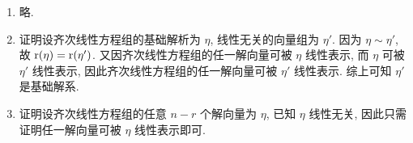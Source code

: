 % 
\begin{enumerate}
    \item %
        略.
    \item %
        {\heiti 证明}\quad 设齐次线性方程组的基础解析为 $\eta$, 线性无关的向量组为 $\eta'$.
        因为 $\eta \sim \eta'$, 故 $\mathrm{r}(\eta) = \mathrm{r}(\eta')$. 又因齐次线性方程组的任一解向量可被 $\eta$ 线性表示, 而 $\eta$ 可被 $\eta'$ 线性表示, 因此齐次线性方程组的任一解向量可被 $\eta'$ 线性表示.
        综上可知 $\eta'$ 是基础解系.
    \item %
        {\heiti 证明}\quad 设齐次线性方程组的任意 $n - r$ 个解向量为 $\eta$, 已知 $\eta$ 线性无关, 因此只需证明任一解向量可被 $\eta$ 线性表示即可.
        

\end{enumerate}

